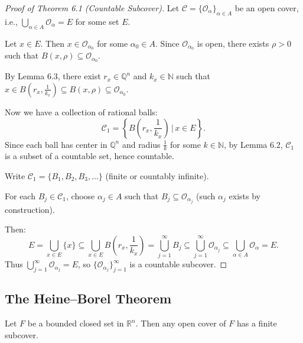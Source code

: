 \documentclass[11pt]{report}
\begin{document}
\begin{proof}[Proof of Theorem 6.1 (Countable Subcover)]
Let $\mathcal{C} = \{\mathcal{O}_\alpha\}_{\alpha \in A}$ be an open cover, i.e., $\bigcup_{\alpha \in A} \mathcal{O}_\alpha = E$ for some set $E$.

Let $x \in E$. Then $x \in \mathcal{O}_{\alpha_0}$ for some $\alpha_0 \in A$. Since $\mathcal{O}_{\alpha_0}$ is open, there exists $\rho > 0$ such that $B(x, \rho) \subseteq \mathcal{O}_{\alpha_0}$.

By Lemma 6.3, there exist $r_x \in \mathbb{Q}^n$ and $k_x \in \mathbb{N}$ such that $x \in B(r_x, \frac{1}{k_x}) \subseteq B(x, \rho) \subseteq \mathcal{O}_{\alpha_0}$.

Now we have a collection of rational balls:
\[
\mathcal{C}_1 = \left\{ B\left(r_x, \frac{1}{k_x}\right) \,\bigg|\, x \in E \right\}.
\]
Since each ball has center in $\mathbb{Q}^n$ and radius $\frac{1}{k}$ for some $k \in \mathbb{N}$, by Lemma 6.2, $\mathcal{C}_1$ is a subset of a countable set, hence countable.

Write $\mathcal{C}_1 = \{B_1, B_2, B_3, \ldots\}$ (finite or countably infinite).

For each $B_j \in \mathcal{C}_1$, choose $\alpha_j \in A$ such that $B_j \subseteq \mathcal{O}_{\alpha_j}$ (such $\alpha_j$ exists by construction).

Then:
\[
E = \bigcup_{x \in E} \{x\} \subseteq \bigcup_{x \in E} B\left(r_x, \frac{1}{k_x}\right) = \bigcup_{j=1}^\infty B_j \subseteq \bigcup_{j=1}^\infty \mathcal{O}_{\alpha_j} \subseteq \bigcup_{\alpha \in A} \mathcal{O}_\alpha = E.
\]
Thus $\bigcup_{j=1}^\infty \mathcal{O}_{\alpha_j} = E$, so $\{\mathcal{O}_{\alpha_j}\}_{j=1}^\infty$ is a countable subcover.
\end{proof}

\subsection{The Heine--Borel Theorem}

\begin{thmbox}
Let $F$ be a bounded closed set in $\mathbb{R}^n$. Then any open cover of $F$ has a finite subcover.
\end{thmbox}
\end{document}
